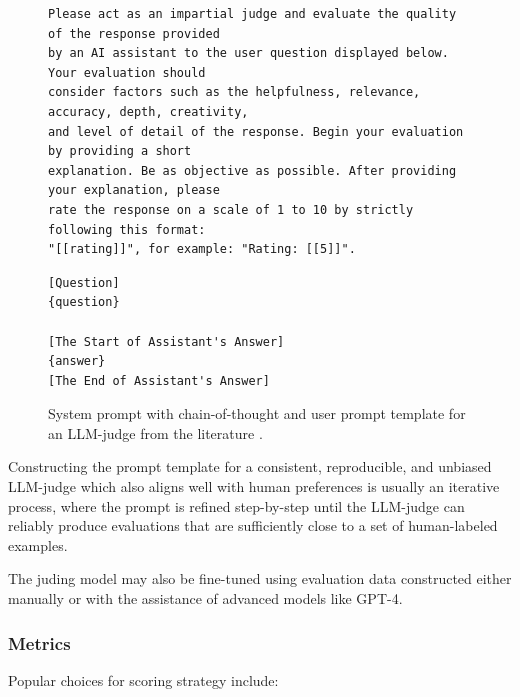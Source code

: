 \documentclass[noindent,nohyp,parspace,titlepage,twoside,12pt]{article}
\begin{document}
        \begin{figure}[hbtp]
          \label{figprompt}
          \begin{lstlisting}[frame=single,linewidth=\textwidth,basicstyle=\scriptsize]
Please act as an impartial judge and evaluate the quality of the response provided
by an AI assistant to the user question displayed below. Your evaluation should
consider factors such as the helpfulness, relevance, accuracy, depth, creativity,
and level of detail of the response. Begin your evaluation by providing a short
explanation. Be as objective as possible. After providing your explanation, please
rate the response on a scale of 1 to 10 by strictly following this format:
"[[rating]]", for example: "Rating: [[5]]".
          \end{lstlisting}
          \begin{lstlisting}[frame=single,linewidth=\textwidth,basicstyle=\scriptsize]
[Question]
{question}

[The Start of Assistant's Answer]
{answer}
[The End of Assistant's Answer]
          \end{lstlisting}
          \caption{%
            System prompt with chain-of-thought and user prompt template for an
            LLM-judge from the literature \cite{arena}.
          }
        \end{figure}

        Constructing the prompt template for a consistent, reproducible, and
        unbiased LLM-judge which also aligns well with human preferences is
        usually an iterative process, where the prompt is refined step-by-step
        until the LLM-judge can reliably produce evaluations that are
        sufficiently close to a set of human-labeled examples.

        The juding model may also be fine-tuned using evaluation data
        constructed either manually or with the assistance of advanced models
        like GPT-4.

      \subsubsection{Metrics}

        Popular choices for scoring strategy include:
\end{document}
